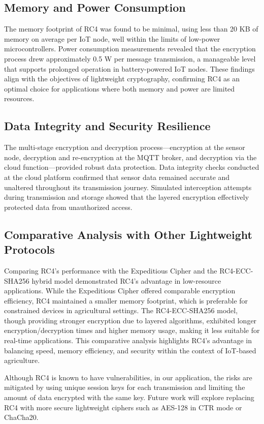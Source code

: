 \documentclass[conference]{IEEEtran}
\begin{document}
\subsection{Memory and Power Consumption}
The memory footprint of RC4 was found to be minimal, using less than 20 KB of memory on average per IoT node, well within the limits of low-power microcontrollers. Power consumption measurements revealed that the encryption process drew approximately 0.5 W per message transmission, a manageable level that supports prolonged operation in battery-powered IoT nodes. These findings align with the objectives of lightweight cryptography, confirming RC4 as an optimal choice for applications where both memory and power are limited resources.

\subsection{Data Integrity and Security Resilience}
The multi-stage encryption and decryption process—encryption at the sensor node, decryption and re-encryption at the MQTT broker, and decryption via the cloud function—provided robust data protection. Data integrity checks conducted at the cloud platform confirmed that sensor data remained accurate and unaltered throughout its transmission journey. Simulated interception attempts during transmission and storage showed that the layered encryption effectively protected data from unauthorized access.

\subsection{Comparative Analysis with Other Lightweight Protocols}
Comparing RC4's performance with the Expeditious Cipher and the RC4-ECC-SHA256 hybrid model demonstrated RC4's advantage in low-resource applications. While the Expeditious Cipher offered comparable encryption efficiency, RC4 maintained a smaller memory footprint, which is preferable for constrained devices in agricultural settings. The RC4-ECC-SHA256 model, though providing stronger encryption due to layered algorithms, exhibited longer encryption/decryption times and higher memory usage, making it less suitable for real-time applications. This comparative analysis highlights RC4's advantage in balancing speed, memory efficiency, and security within the context of IoT-based agriculture.

Although RC4 is known to have vulnerabilities, in our application, the risks are mitigated by using unique session keys for each transmission and limiting the amount of data encrypted with the same key. Future work will explore replacing RC4 with more secure lightweight ciphers such as AES-128 in CTR mode or ChaCha20.
\end{document}
